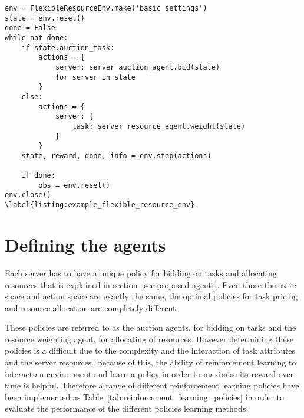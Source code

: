 \begin{lstlisting}
env = FlexibleResourceEnv.make('basic_settings')
state = env.reset()
done = False
while not done:
    if state.auction_task:
        actions = {
            server: server_auction_agent.bid(state)
            for server in state
        }
    else:
        actions = {
            server: {
                task: server_resource_agent.weight(state)
            }
        }
    state, reward, done, info = env.step(actions)

    if done:
        obs = env.reset()
env.close()
\label{listing:example_flexible_resource_env}
\end{lstlisting}

\section{Defining the agents}\label{sec:agent-definition}
Each server has to have a unique policy for bidding on tasks and allocating resources that is explained in
section~\ref{sec:proposed-agents}. Even those the state space and action space are exactly the same, the optimal
policies for task pricing and resource allocation are completely different.

These policies are referred to as the auction agents, for bidding on tasks and the resource weighting agent,
for allocating of resources. However determining these policies is a difficult due to the complexity and the interaction
of task attributes and the server resources. Because of this, the ability of reinforcement learning to interact
an environment and learn a policy in order to maximise its reward over time is helpful. Therefore a range of different
reinforcement learning policies have been implemented as Table~\ref{tab:reinforcement_learning_policies} in order to
evaluate the performance of the different policies learning methods.

